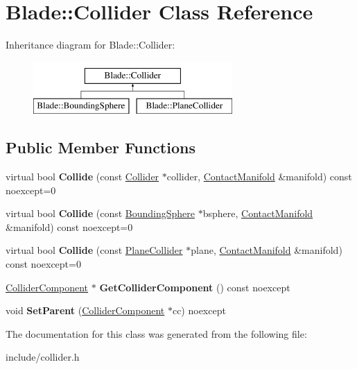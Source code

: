 \hypertarget{class_blade_1_1_collider}{}\section{Blade\+:\+:Collider Class Reference}
\label{class_blade_1_1_collider}
Inheritance diagram for Blade\+:\+:Collider\+:\begin{figure}[H]
\begin{center}
\leavevmode
\includegraphics[height=2.000000cm]{class_blade_1_1_collider}
\end{center}
\end{figure}
\subsection*{Public Member Functions}
\begin{DoxyCompactItemize}
\item 
\mbox{\label{class_blade_1_1_collider_ae938f3f578348c063651bd51c1050f17}} 
virtual bool {\bfseries Collide} (const \hyperlink{class_blade_1_1_collider}{Collider} $\ast$collider, \hyperlink{class_blade_1_1_contact_manifold}{Contact\+Manifold} \&manifold) const noexcept=0
\item 
\mbox{\label{class_blade_1_1_collider_a40861d157496f41072a290a3da498fc9}} 
virtual bool {\bfseries Collide} (const \hyperlink{class_blade_1_1_bounding_sphere}{Bounding\+Sphere} $\ast$bsphere, \hyperlink{class_blade_1_1_contact_manifold}{Contact\+Manifold} \&manifold) const noexcept=0
\item 
\mbox{\label{class_blade_1_1_collider_ab5988bae63836308e67e26c5a0f1f62d}} 
virtual bool {\bfseries Collide} (const \hyperlink{class_blade_1_1_plane_collider}{Plane\+Collider} $\ast$plane, \hyperlink{class_blade_1_1_contact_manifold}{Contact\+Manifold} \&manifold) const noexcept=0
\item 
\mbox{\label{class_blade_1_1_collider_a8e00c2409092ee0f458d134636d90c60}} 
\hyperlink{class_blade_1_1_collider_component}{Collider\+Component} $\ast$ {\bfseries Get\+Collider\+Component} () const noexcept
\item 
\mbox{\label{class_blade_1_1_collider_affd7dabd926a2e2b3cf857f434976769}} 
void {\bfseries Set\+Parent} (\hyperlink{class_blade_1_1_collider_component}{Collider\+Component} $\ast$cc) noexcept
\end{DoxyCompactItemize}


The documentation for this class was generated from the following file\+:\begin{DoxyCompactItemize}
\item 
include/collider.\+h\end{DoxyCompactItemize}
